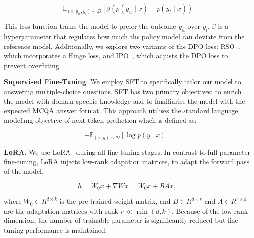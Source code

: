\begin{equation}
    \label{eq:dpo}
    -\mathbb{E}_{(x, y_w, y_l) \sim \mathcal{D}} \left[\beta(p(y_w \mid x) - p(y_l \mid x)) \right]
\end{equation}

This loss function trains the model to prefer the outcome $y_w$ over $y_l$. $\beta$ is a hyperparameter that regulates how much the policy model can deviate from the reference model. Additionally, we explore two variants of the DPO loss: RSO~\cite{rso}, which incorporates a Hinge loss, and IPO~\cite{ipo}, which adjusts the DPO loss to prevent overfitting.

 
\textbf{Supervised Fine-Tuning}. We employ SFT to specifically tailor our model to answering multiple-choice questions. SFT has two primary objectives: to enrich the model with domain-specific knowledge and to familiarise the model with the expected MCQA answer format. This approach utilises the standard language modelling objective of next token prediction which is defined as:

\begin{equation}
    \label{eq:sft}
    -\mathbb{E}_{(x, y) \sim \mathcal{D}} \left[ \log p(y \mid x) \right]
\end{equation}

\textbf{LoRA.} We use LoRA~\cite{lora} during all
fine-tuning stages. In contrast to full-parameter fine-tuning, LoRA injects
low-rank adapation matrices, to adapt the forward pass of the model.

\begin{equation}
    \label{eq:lora}
    h = W_0x  + \nabla Wx = W_0x + BAx,
\end{equation}

where $W_0 \in R^{d \times k}$ is the pre-trained weight matrix, and $B \in R^{d
\times r}$ and $A \in R^{r \times k}$ are the adaptation matrices with rank $r
\ll \min(d, k)$. Because of the low-rank dimension, the number of trainable
parameter is significantly reduced but fine-tuning performance is
maintained.

